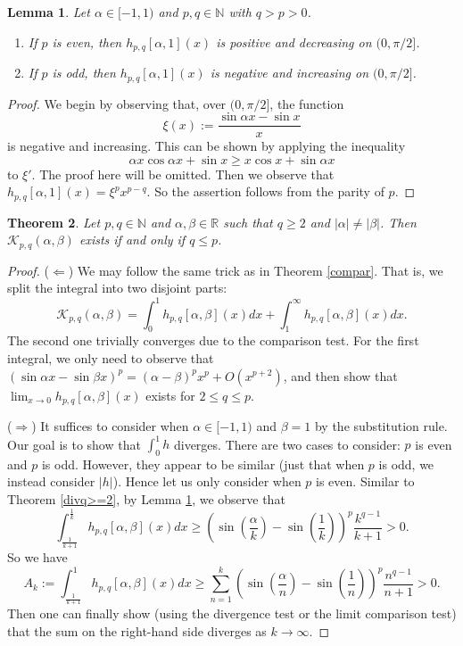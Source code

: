 \documentclass[12pt, reqno]{amsart}
\theoremstyle{plain}
\newtheorem{theorem}{Theorem}[section]
\newtheorem{lemma}[theorem]{Lemma}
\theoremstyle{definition}
\begin{document}
\begin{lemma}\label{lem6.3}
Let $\alpha\in[-1,1)$ and $p, q\in\mathbb{N}$ with $q>p>0$.
\begin{enumerate}
    \item [(a)] If $p$ is even, then $h_{p, q}[\alpha, 1](x)$ is positive and decreasing on $(0, \pi/2]$.
    \item [(b)] If $p$ is odd, then $h_{p, q}[\alpha, 1](x)$ is negative and increasing on $(0, \pi/2]$. 
\end{enumerate} 
\end{lemma}
\begin{proof}
We begin by observing that, over $(0, \pi/2]$, the function
\[\xi(x):=\frac{\sin \alpha x-\sin x}{x}\]
is negative and increasing. This can be shown by applying the inequality \[\alpha x\cos\alpha x+\sin x\ge x\cos x+\sin\alpha x\] to $\xi'$. The proof here will be omitted.
Then we observe that $h_{p, q}[\alpha, 1](x)=\xi^{p}x^{p-q}$. So the assertion follows from the parity of $p$.
\end{proof}

\begin{theorem}
   Let $p, q\in\mathbb{N}$ and $\alpha, \beta\in\mathbb{R}$ such that $q\ge 2$ and $|\alpha|\ne|\beta|$. Then $\mathcal{K}_{p, q}(\alpha, \beta)$ exists if and only if $q\le p$.
\end{theorem}
\begin{proof}
	($\Leftarrow$) We may follow the same trick as in Theorem \ref{compar}. That is, we split the integral into two disjoint parts: \[\mathcal{K}_{p, q}(\alpha, \beta)=\int_0^1 h_{p, q}[\alpha, \beta](x)dx+\int_1^{\infty} h_{p, q}[\alpha, \beta](x)dx.\] The second one trivially converges due to the comparison test. For the first integral, we only need to observe that
	$(\sin \alpha x-\sin \beta x)^p=(\alpha-\beta)^px^p+O(x^{p+2})$,
	and then show that $\lim_{x\to 0}h_{p, q}[\alpha, \beta](x)$ exists for $2\le q\le p$.

    ($\Rightarrow$) It suffices to consider when $\alpha\in[-1, 1)$ and $\beta=1$ by the substitution rule. Our goal is to show that $\int_0^1h$ diverges. There are two cases to consider: $p$ is even and $p$ is odd. However, they appear to be similar (just that when $p$ is odd, we instead consider $|h|$). Hence let us only consider when $p$ is even. Similar to Theorem \ref{divq>=2}, by Lemma \ref{lem6.3}, we observe that
    \[\int_{\frac{1}{k+1}}^{\frac{1}{k}}h_{p, q}[\alpha, \beta](x)dx\ge \left(\sin\left(\frac{\alpha}{k}\right)-\sin\left(\frac{1}{k}\right)\right)^p\frac{k^{q-1}}{k+1}>0.\]
    So we have
    \[A_k:=\int_{\frac{1}{k+1}}^1h_{p, q}[\alpha, \beta](x)dx\ge\sum_{n=1}^k\left(\sin\left(\frac{\alpha}{n}\right)-\sin\left(\frac{1}{n}\right)\right)^p\frac{n^{q-1}}{n+1}>0.\]
    Then one can finally show (using the divergence test or the limit comparison test) that the sum on the right-hand side diverges as $k\to\infty$.
\end{proof}
\end{document}
